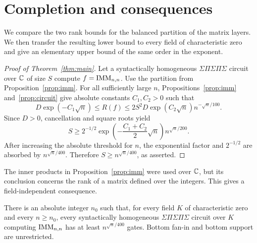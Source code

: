 \section{Completion and consequences}
\label{sec:completion}

We compare the two rank bounds for the balanced partition of the matrix
layers.  We then transfer the resulting lower bound to every field of
characteristic zero and give an elementary upper bound of the same order
in the exponent.

\begin{proof}[Proof of Theorem~\ref{thm:main}]
Let a syntactically homogeneous $\Sigma\Pi\Sigma\Pi\Sigma$ circuit over
$\mathbb C$ of size $S$ compute $f=\operatorname{IMM}_{n,n}$.  Use the partition from
Proposition~\ref{prop:imm}.  For all sufficiently large $n$,
Propositions~\ref{prop:imm} and~\ref{prop:circuit} give absolute
constants $C_1,C_2>0$ such that
\[
 D\exp(-C_1\sqrt n)
 \le R(f)
 \le 2S^2D\exp(C_2\sqrt n)n^{-\sqrt n/100}.
\]
Since $D>0$, cancellation and square roots yield
\[
 S\ge 2^{-1/2}
       \exp\left(-\frac{C_1+C_2}{2}\sqrt n\right)
       n^{\sqrt n/200}.
\]
After increasing the absolute threshold for $n$, the exponential factor
and $2^{-1/2}$ are absorbed by $n^{\sqrt n/400}$.  Therefore
$S\ge n^{\sqrt n/400}$, as asserted.
\end{proof}

The inner products in Proposition~\ref{prop:imm} were used over
$\mathbb C$, but its conclusion concerns the rank of a matrix defined over
the integers.  This gives a field-independent consequence.

\begin{corollary}
\label{cor:characteristic-zero}
There is an absolute integer $n_0$ such that, for every field $K$ of
characteristic zero and every $n\ge n_0$, every syntactically homogeneous
$\Sigma\Pi\Sigma\Pi\Sigma$ circuit over $K$ computing $\operatorname{IMM}_{n,n}$
has at least $n^{\sqrt n/400}$ gates.  Bottom fan-in and bottom support
are unrestricted.
\end{corollary}

